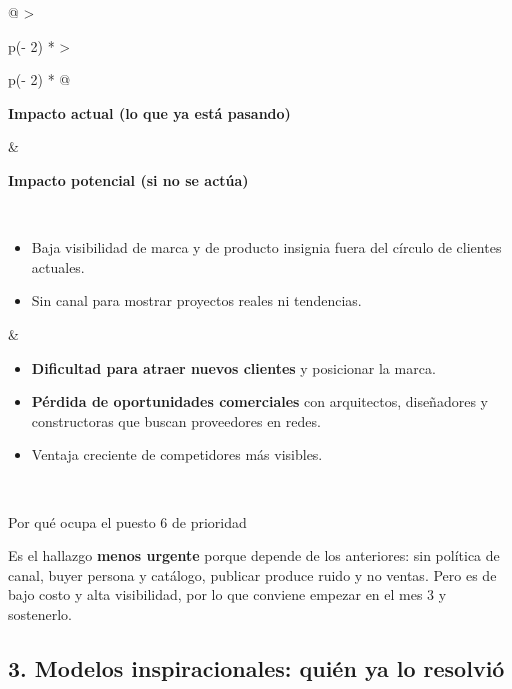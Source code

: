 \documentclass[11pt,a4paper]{article}
\begin{document}
\begin{longtable}[]{@{}
  >{\raggedright\arraybackslash}p{(\columnwidth - 2\tabcolsep) * }
  >{\raggedright\arraybackslash}p{(\columnwidth - 2\tabcolsep) * }@{}}
\toprule\noalign{}
\begin{minipage}[b]{\linewidth}\raggedright
\textbf{Impacto actual (lo que ya está pasando)}
\end{minipage} & \begin{minipage}[b]{\linewidth}\raggedright
\textbf{Impacto potencial (si no se actúa)}
\end{minipage} \\
\midrule\noalign{}
\endfirsthead
\bottomrule\noalign{}
\endlastfoot
\begin{minipage}[t]{\linewidth}\raggedright
\begin{itemize}
\item
  Baja visibilidad de marca y de producto insignia fuera del círculo de clientes actuales.
\item
  Sin canal para mostrar proyectos reales ni tendencias.
\end{itemize}
\end{minipage} & \begin{minipage}[t]{\linewidth}\raggedright
\begin{itemize}
\item
  \textbf{Dificultad para atraer nuevos clientes} y posicionar la marca.
\item
  \textbf{Pérdida de oportunidades comerciales} con arquitectos, diseñadores y constructoras que
  buscan proveedores en redes.
\item
  Ventaja creciente de competidores más visibles.
\end{itemize}
\end{minipage} \\
\end{longtable}

\begin{cajaaviso}{Por qué ocupa el puesto 6 de prioridad}

Es el hallazgo \textbf{menos urgente} porque depende de los anteriores: sin política de canal, buyer
persona y catálogo, publicar produce ruido y no ventas. Pero es de bajo costo y alta visibilidad,
por lo que conviene empezar en el mes 3 y sostenerlo.

\end{cajaaviso}


\hypertarget{modelos-inspiracionales-quiuxe9n-ya-lo-resolviuxf3-5}{%
\subsection*{3. Modelos inspiracionales: quién ya lo
resolvió}\label{modelos-inspiracionales-quiuxe9n-ya-lo-resolviuxf3-5}}
\end{document}

